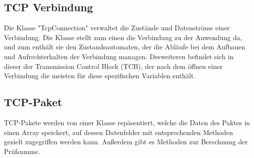 \subsection{TCP Verbindung}
Die Klasse "{}TcpConnection"{} verwaltet die Zustände und Datenströme einer Verbindung. Die Klasse stellt zum einen die Verbindung zu der Anwendung da, und zum enthält sie den Zustandsautomaten, der die Abläufe bei dem Aufbauen und Aufrechterhalten der Verbindung managen. Desweiteren befindet sich in dieser der Transmission Control Block (TCB), der nach dem öffnen einer Verbindung die meisten für diese spezifischen Variablen enthält.   

\subsection{TCP-Paket}
TCP-Pakete werden von einer Klasse repäsentiert, welche die Daten des Paktes in einen Array speichert, auf dessen Datenfelder mit entsprechenden Methoden gezielt zugegriffen werden kann. Außerdem gibt es Methoden zur Berechnung der Prüfsumme.


